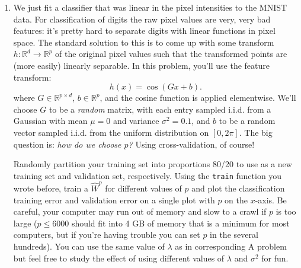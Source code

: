 \documentclass{article}
\begin{document}
\begin{bprob}
    \begin{enumerate}
        \item {} We just fit a classifier that was linear in the pixel intensities to the MNIST data. For classification of digits the raw pixel values are very, very bad features: it's pretty hard to separate digits with linear functions in pixel space. The standard solution to this is to come up with some transform $h : \mathbb{R}^d \rightarrow \mathbb{R}^p$ of the original pixel values such that the transformed points are (more easily) linearly separable. In this problem, you'll use the feature transform:
        \[
            h(x) = \cos(G x + b).
        \]
        where $G \in \mathbb{R}^{p \times d}$, $b \in \mathbb{R}^p$, and the cosine function is applied elementwise. We'll choose $G$ to be a \emph{random} matrix, with each entry sampled i.i.d. from a Gaussian with mean $\mu=0$ and variance $\sigma^2=0.1$, and $b$ to be a random vector sampled i.i.d. from the uniform distribution on $[0,2\pi].$ The big question is: \emph{how do we choose $p$?} Using cross-validation, of course!
        
        Randomly partition your training set into proportions 80/20 to use as a new training set and validation set, respectively. Using the \verb|train| function you wrote before, train a $\widehat{W}^{p}$ for different values of $p$ and plot the classification training error and validation error on a single plot with $p$ on the $x$-axis. Be careful, your computer may run out of memory and slow to a crawl if $p$ is too large ($p\leq 6000$ should fit into 4 GB of memory that is a minimum for most computers, but if you're having trouble you can set $p$ in the several hundreds). You can use the same value of $\lambda$ as in corresponding A problem but feel free to study the effect of using different values of $\lambda$ and $\sigma^2$ for fun.
        

\end{enumerate}
\end{bprob}
\end{document}
